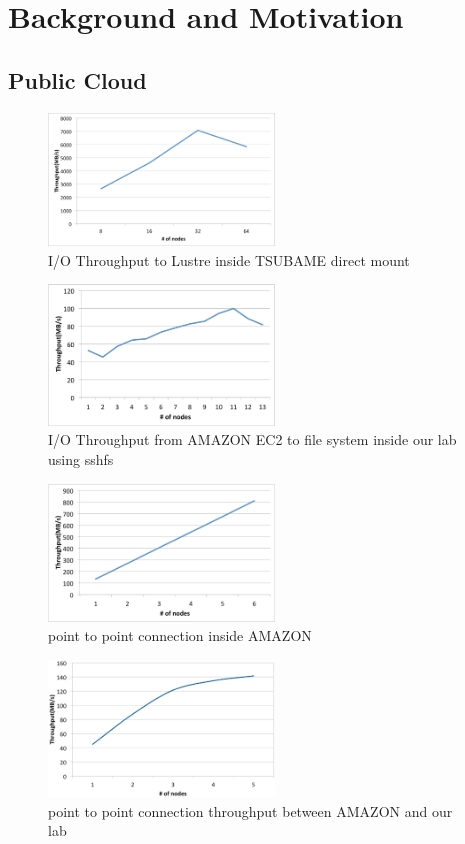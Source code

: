 \section{Background and Motivation}
\label{sec:motivation}
\subsection{Public Cloud}
\label{sec:public_cloud}
\begin{figure}[tb]
	\centering
	\includegraphics[width=6cm]{../img/throughput_tsubame}
	\caption{I/O Throughput to Lustre inside TSUBAME direct mount}
	\label{throughput TSUBAME}
\end{figure}

\begin{figure}[tb]
	\centering
	\includegraphics[width=6cm]{../img/AMAZON_to_OUR_LAB}
	\caption{I/O Throughput from AMAZON EC2 to file system inside our lab using sshfs}
	\label{throughput AMAZON to OURLAB}
\end{figure}

\begin{figure}[tb]
	\centering
	\includegraphics[width=6cm]{../img/point_to_point_AMAZON}
	\caption{point to point connection inside AMAZON}
	\label{point to point connection AMAZON}
\end{figure}

\begin{figure}[tb]
	\centering
	\includegraphics[width=6cm]{../img/point_to_point_lab}
	\caption{point to point connection throughput between AMAZON and our lab}
	\label{point to point connection LAB}
\end{figure}

